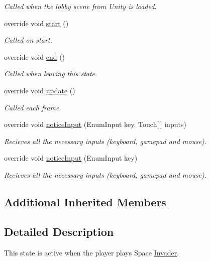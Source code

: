 \begin{DoxyCompactItemize}
\begin{DoxyCompactList}\small\item\em Called when the lobby scene from Unity is loaded.\end{DoxyCompactList}\item 
override void \hyperlink{class_space_invader_state_a2b839470ff8344a6f090aa68df1cfa5b}{start} ()
\begin{DoxyCompactList}\small\item\em Called on start.\end{DoxyCompactList}\item 
override void \hyperlink{class_space_invader_state_a2f0ea75c238c2e42f790e6f4ad8780ae}{end} ()
\begin{DoxyCompactList}\small\item\em Called when leaving this state.\end{DoxyCompactList}\item 
override void \hyperlink{class_space_invader_state_a2514e1cc361e663348bf190bacda343f}{update} ()
\begin{DoxyCompactList}\small\item\em Called each frame.\end{DoxyCompactList}\item 
override void \hyperlink{class_space_invader_state_a9d787fe40541a10e25ac96029254b9c7}{notice\-Input} (Enum\-Input key, Touch\mbox{[}$\,$\mbox{]} inputs)
\begin{DoxyCompactList}\small\item\em Recieves all the necessary inputs (keyboard, gamepad and mouse).\end{DoxyCompactList}\item 
override void \hyperlink{class_space_invader_state_aefd9b0488dfd4d515e4ef394e8f9bb36}{notice\-Input} (Enum\-Input key)
\begin{DoxyCompactList}\small\item\em Recieves all the necessary inputs (keyboard, gamepad and mouse).\end{DoxyCompactList}\end{DoxyCompactItemize}
\subsection*{Additional Inherited Members}


\subsection{Detailed Description}
This state is active when the player plays Space \hyperlink{class_invader}{Invader}.



